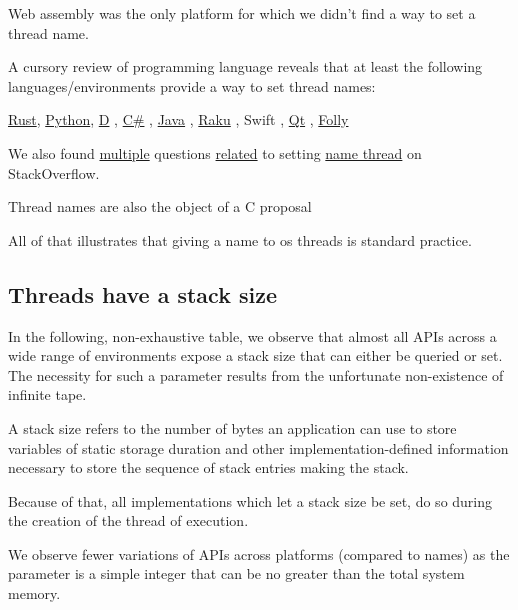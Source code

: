 \documentclass{wg21}
\begin{document}
Web assembly was the only platform for which we didn't find a way to set a thread name.

A cursory review of programming language reveals that at least the following languages/environments provide a way to set thread names:

\href{https://doc.rust-lang.org/std/thread/struct.Builder.html}{Rust}, \href{https://docs.python.org/3/library/threading.html#thread-objects}{Python}, \href{https://dlang.org/phobos/core_thread_osthread.html#.Thread.name}{D}
, \href{https://docs.microsoft.com/en-us/dotnet/api/system.threading.thread.name?view=netframework-4.8}{C\#}
, \href{https://docs.oracle.com/javase/7/docs/api/java/lang/Thread.html}{Java}
, \href{https://docs.raku.org/type/Thread#method_name}{Raku}
, Swift
, \href{https://doc.qt.io/qt-5/qthread.html#managing-threads}{Qt}
, \href{https://github.com/facebook/folly/blob/master/folly/system/ThreadName.h}{Folly}

We also found \href{https://stackoverflow.com/questions/10121560/stdthread-naming-your-thread}{multiple} questions \href{https://stackoverflow.com/questions/57477053/how-to-set-custom-name-of-this-thread}{related} to setting \href{https://stackoverflow.com/questions/16486937/name-a-thread-created-by-beginthread-in-c}{name thread}
on StackOverflow.

Thread names are also the object of a C proposal \cite{N2419}

All of that illustrates that giving a name to os threads is standard practice.


\subsection{Threads have a stack size}

In the following, non-exhaustive table, we observe that almost all APIs across a wide range
of environments expose a stack size that can either be queried or set.
The necessity for such a parameter results from the unfortunate non-existence of infinite tape.

A stack size refers to the number of bytes an application can use to store variables of static storage duration and other implementation-defined information
necessary to store the sequence of stack entries making the stack.

Because of that, all implementations which let a stack size be set, do so during the creation of the thread
of execution.

We observe fewer variations of APIs across platforms (compared to names) as the parameter is a simple integer
that can be no greater than the total system memory.
\end{document}
